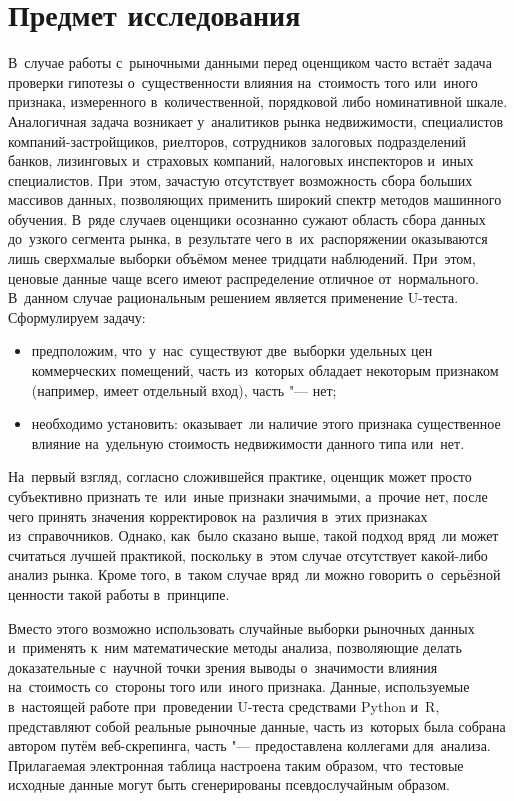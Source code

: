 \documentclass[]{scrreprt}
\begin{document}
\chapter{Предмет исследования}
В~случае работы с~рыночными данными перед оценщиком часто встаёт задача проверки гипотезы о~существенности влияния на~стоимость того или~иного признака, измеренного в~количественной, порядковой либо номинативной шкале. Аналогичная задача возникает у~аналитиков рынка недвижимости, специалистов компаний-застройщиков, риелторов, сотрудников залоговых подразделений банков, лизинговых и~страховых компаний, налоговых инспекторов и~иных специалистов. При~этом, зачастую отсутствует возможность сбора больших массивов данных, позволяющих применить широкий спектр методов машинного обучения. В~ряде случаев оценщики осознанно сужают область сбора данных до~узкого сегмента рынка, в~результате чего в~их~распоряжении оказываются лишь сверхмалые выборки объёмом менее тридцати наблюдений. При~этом, ценовые данные чаще всего имеют распределение отличное от~нормального. В~данном случае рациональным решением является применение U-теста. Сформулируем задачу:
\begin{itemize}
	\item предположим, что~у~нас~существуют две~выборки удельных цен коммерческих помещений, часть из~которых обладает некоторым признаком (например, имеет отдельный вход), часть "--- нет;
	\item необходимо установить: оказывает~ли наличие этого признака существенное влияние на~удельную стоимость недвижимости данного типа или~нет.
\end{itemize}
На~первый взгляд, согласно сложившейся практике, оценщик может просто субъективно признать те~или~иные признаки значимыми, а~прочие нет, после чего принять значения корректировок на~различия в~этих признаках из~справочников. Однако, как~было сказано выше, такой подход вряд~ли может считаться лучшей практикой, поскольку в~этом случае отсутствует какой-либо анализ рынка. Кроме того, в~таком случае вряд~ли можно говорить о~серьёзной ценности такой работы в~принципе.

Вместо этого возможно использовать случайные выборки рыночных данных и~применять к~ним математические методы анализа, позволяющие делать доказательные с~научной точки зрения выводы о~значимости влияния на~стоимость со~стороны того или~иного признака. Данные, используемые в~настоящей работе при~проведении U-теста средствами Python и~R, представляют собой реальные рыночные данные, часть из~которых была собрана автором путём веб-скрепинга, часть "--- предоставлена коллегами для~анализа. Прилагаемая электронная таблица настроена таким образом, что~тестовые исходные данные могут быть сгенерированы псевдослучайным образом.
\end{document}
